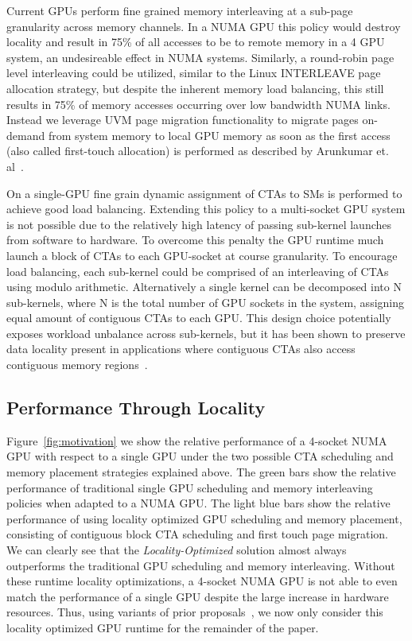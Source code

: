 Current GPUs perform fine grained memory interleaving at a sub-page granularity
across memory channels.  In a NUMA GPU this policy would destroy locality and
result in 75\% of all accesses to be to remote memory in a 4 GPU system, an
undesireable effect in NUMA systems.  Similarly, a round-robin page level 
interleaving
could be utilized, similar to the Linux INTERLEAVE page allocation strategy,
but despite the inherent memory load balancing, this still results in 75\% of
memory accesses occurring over low bandwidth NUMA links. Instead we leverage
UVM page migration functionality to migrate pages on-demand from system memory 
to local GPU memory as soon as the first access (also called first-touch 
allocation) 
is performed as described by Arunkumar et. al~\cite{Arunkumar2017}.

On a single-GPU fine grain dynamic assignment of CTAs to SMs is performed to 
achieve good load balancing.  Extending this policy to a multi-socket GPU 
system is not possible due to the relatively high latency of passing sub-kernel 
launches from software to hardware.  To overcome this penalty the GPU runtime 
much launch a block of CTAs to each GPU-socket at course granularity.  To 
encourage load balancing, each sub-kernel could be comprised of an interleaving 
of CTAs using modulo arithmetic.  Alternatively a single kernel can be 
decomposed into N sub-kernels, where N is the total number of GPU sockets in 
the system, assigning equal amount of contiguous CTAs to each GPU.  This design 
choice potentially exposes workload unbalance across sub-kernels, but it has 
been shown to preserve data locality present in applications where contiguous 
CTAs also access contiguous memory regions~\cite{Cabezas2015,Arunkumar2017}.

\subsection{Performance Through Locality} 

Figure~\ref{fig:motivation} we show the relative performance of a 4-socket NUMA 
GPU with respect to a single GPU under the two possible CTA scheduling and 
memory placement strategies explained above.  The green bars show the 
relative performance of traditional single GPU scheduling and memory 
interleaving policies when adapted to a NUMA GPU. The light blue bars
show the relative performance of using locality optimized GPU scheduling and 
memory placement, consisting of contiguous block CTA scheduling and first touch 
page migration. We can clearly see that the \textit{Locality-Optimized} 
solution almost always outperforms the traditional GPU scheduling and memory 
interleaving.  Without these runtime locality optimizations, a 4-socket NUMA 
GPU is not able to even match the performance of a single GPU despite the large 
increase in hardware resources.  Thus, using variants of prior 
proposals~\cite{Cabezas2015,Arunkumar2017}, we now only consider this locality 
optimized GPU runtime for the remainder of the paper.

